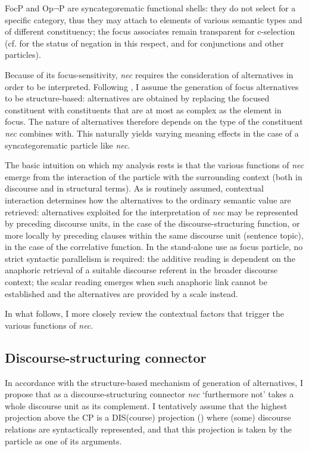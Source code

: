 \documentclass[output=paper,modfonts,nonflat,citecolor=brown,
showindex
]{langsci/langscibook}
\begin{document}
FocP and Op$\lnot$P are syncategorematic functional shells: they do not select for a specific category, thus they may attach to elements of various semantic types and of different constituency; the focus associates remain transparent for c-selection (cf. \citealt[120-126]{Cinque99} for the status of negation in this respect, and \citealt[199-203]{BHR14} for conjunctions and other particles).

Because of its focus-sensitivity, {\emph{nec}} requires the consideration of alternatives in order to be interpreted. Following \citet{Katzir07, FoxKatzir11}, I assume the generation of focus alternatives to be structure-based: alternatives are obtained by replacing the focused constituent with constituents that are at most as complex as the element in focus. The nature of alternatives therefore depends on the type of the constituent {\emph{nec}} combines with. This naturally yields varying meaning effects in the case of a syncategorematic particle like {\emph{nec}}.

The basic intuition on which my analysis rests is that the various functions of {\emph{nec}} emerge from the interaction of the particle with the surrounding context (both in discourse and in structural terms). As is routinely assumed, contextual interaction determines how the alternatives to the ordinary semantic value are retrieved: alternatives exploited for the interpretation of {\emph{nec}} may be represented by preceding discourse units, in the case of the discourse-structuring function, or more locally by preceding clauses within the same discourse unit (sentence topic), in the case of the correlative function. In the stand-alone use as focus particle, no strict syntactic parallelism is required: the additive reading is dependent on the anaphoric retrieval of a suitable discourse referent in the broader discourse context; the scalar reading emerges when such anaphoric link cannot be established and the alternatives are provided by a scale instead. 

In what follows, I more closely review the contextual factors that trigger the various functions of {\emph{nec}}.

\subsection{Discourse-structuring connector} \label{analysisdiscuousestructuring}

In accordance with the structure-based mechanism of generation of alternatives, I propose that as a discourse-structuring connector {\emph{nec}} `furthermore not' takes a whole discourse unit as its complement. I tentatively assume that the highest projection above the CP is a DIS(course) projection (\citealt{Giorgi15}) where (some) discourse relations are syntactically represented, and that this projection is taken by the particle as one of its arguments.
\end{document}
